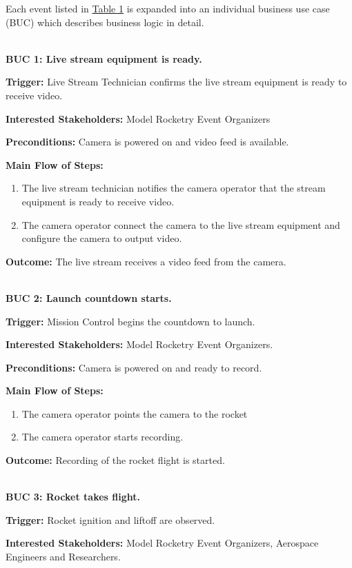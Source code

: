 \documentclass[12pt]{article}
\begin{document}
Each event listed in \hyperref[tab:work-part]{Table 1} is expanded into an
individual business use case (BUC) which describes business logic in detail.

~\\

\textbf{BUC 1: Live stream equipment is ready.}

\textbf{Trigger:} Live Stream Technician confirms the live stream equipment is ready to receive video.

\textbf{Interested Stakeholders:} Model Rocketry Event Organizers

\textbf{Preconditions:} Camera is powered on and video feed is available.

\textbf{Main Flow of Steps:}
\begin{enumerate}
  \item The live stream technician notifies the camera operator that the stream
        equipment is ready to receive video.
  \item The camera operator connect the camera to the live stream equipment and
        configure the camera to output video.
\end{enumerate}

\textbf{Outcome:} The live stream receives a video feed from the camera.

~\\

\textbf{BUC 2: Launch countdown starts.}

\textbf{Trigger:} Mission Control begins the countdown to launch.

\textbf{Interested Stakeholders:} Model Rocketry Event Organizers.

\textbf{Preconditions:} Camera is powered on and ready to record.

\textbf{Main Flow of Steps:}
\begin{enumerate}
  \item The camera operator points the camera to the rocket
  \item The camera operator starts recording.
\end{enumerate}

\textbf{Outcome:} Recording of the rocket flight is started.

~\\

\textbf{BUC 3: Rocket takes flight.}

\textbf{Trigger:} Rocket ignition and liftoff are observed.

\textbf{Interested Stakeholders:} Model Rocketry Event Organizers, Aerospace Engineers and Researchers.
\end{document}
